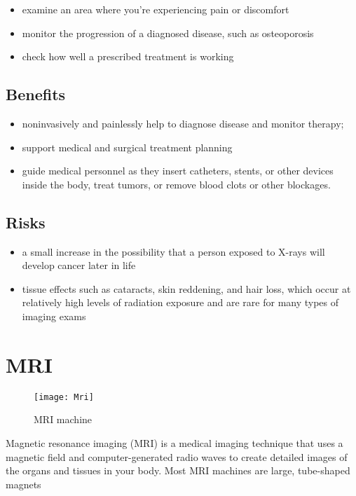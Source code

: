 \documentclass[12pt]{article}
\begin{document}
\begin{itemize}
\item examine an area where you’re experiencing pain or discomfort
\item monitor the progression of a diagnosed disease, such as osteoporosis
\item check how well a prescribed treatment is working
\end{itemize}

\subsection{Benefits}

\begin{itemize}
\item noninvasively and painlessly help to diagnose disease and monitor therapy;
\item support medical and surgical treatment planning
\item guide medical personnel as they insert catheters, stents, or other devices inside the body, treat tumors, or remove blood clots or other blockages.
\end{itemize}

\subsection{Risks}

\begin{itemize}
\item a small increase in the possibility that a person exposed to X-rays will develop cancer later in life
\item tissue effects such as cataracts, skin reddening, and hair loss, which occur at relatively high levels of radiation exposure and are rare for many types of imaging exams
\end{itemize}

\section{MRI}
\begin{figure}
\centering
\texttt{[image: Mri]}
\caption{MRI machine}

\end{figure}
Magnetic resonance imaging (MRI) is a medical imaging technique that uses a magnetic field and computer-generated radio waves to create detailed images of the organs and tissues in your body. Most MRI machines are large, tube-shaped magnets
\end{document}
